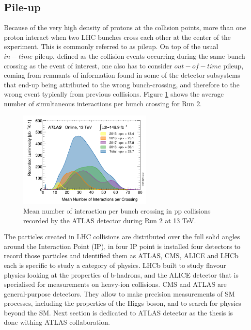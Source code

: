 \subsection{Pile-up}
\label{chap2:LHC:PU}
Because of the very high density of protons at the collision points, more than one proton interact when two LHC bunches cross each other at the center of the experiment. This is commonly referred to as pileup. On top of the usual $in-time$ pileup, defined as the collision events occurring during the same bunch-crossing as the event of interest, one also has to consider $out-of-time$ pileup, coming from remnants of information found in some of the detector subsystems that end-up being attributed to the wrong bunch-crossing, and therefore to the wrong event typically from previous collisions. Figure \ref{fig:chap2:LHC:PU} shows the average number of simultaneous interactions per bunch crossing for Run 2. \\
\begin{figure}[H]
    \centering
    \includegraphics[width=0.6\textwidth]{Ch2/Img/PU.png}
    \caption{Mean number of interaction per bunch crossing in pp collisions recorded by the ATLAS detector during Run 2 at 13 TeV.}
    \label{fig:chap2:LHC:PU}
\end{figure}
The particles created in LHC collisions are distributed over the full solid angles around the Interaction Point (IP), in four IP point is installed four detectors to record those particles and identified them as ATLAS, CMS, ALICE and LHCb each is specific to study a category of physics. LHCb built to study flavour physics looking at the properties of b-hadrons, and the ALICE detector that is specialised for measurements on heavy-ion collisions. CMS and ATLAS are general-purpose detectors. They allow to make precision measurements of SM processes, including the properties of the Higgs boson, and to search for physics beyond the SM. Next section is dedicated to ATLAS detector as the thesis is done withing ATLAS collaboration.

